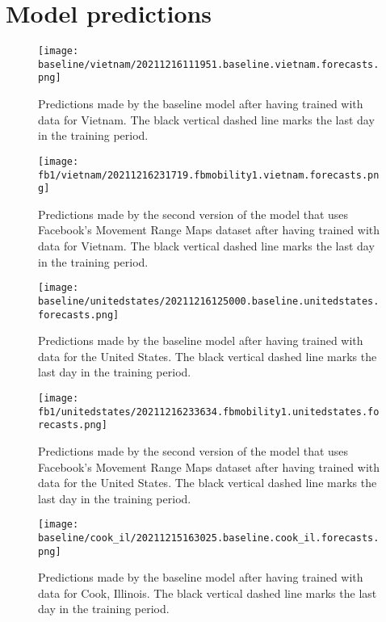 \appendix

\chapter{Model predictions}


\begin{figure}[!htb]
    \centering
    \texttt{[image: baseline/vietnam/20211216111951.baseline.vietnam.forecasts.png]}
    \caption{Predictions made by the baseline model after having trained with data for Vietnam. The black vertical dashed line marks the last day in the training period.}
    \label{fig:predictions-vietnam-baseline}
\end{figure}

\begin{figure}[!htb]
    \centering
    \texttt{[image: fb1/vietnam/20211216231719.fbmobility1.vietnam.forecasts.png]}
    \caption{Predictions made by the second version of the model that uses Facebook's Movement Range Maps dataset after having trained with data for Vietnam. The black vertical dashed line marks the last day in the training period.}
    \label{fig:predictions-vietnam-fb1}
\end{figure}


\begin{figure}[!htb]
    \centering
    \texttt{[image: baseline/unitedstates/20211216125000.baseline.unitedstates.forecasts.png]}
    \caption{Predictions made by the baseline model after having trained with data for the United States. The black vertical dashed line marks the last day in the training period.}
    \label{fig:predictions-usa-baseline}
\end{figure}

\begin{figure}[!htb]
    \centering
    \texttt{[image: fb1/unitedstates/20211216233634.fbmobility1.unitedstates.forecasts.png]}
    \caption{Predictions made by the second version of the model that uses Facebook's Movement Range Maps dataset after having trained with data for the United States. The black vertical dashed line marks the last day in the training period.}
    \label{fig:predictions-usa-fb1}
\end{figure}


\begin{figure}[!htb]
    \centering
    \texttt{[image: baseline/cook\_il/20211215163025.baseline.cook\_il.forecasts.png]}
    \caption{Predictions made by the baseline model after having trained with data for Cook, Illinois. The black vertical dashed line marks the last day in the training period.}
    \label{fig:predictions-cook-baseline}
\end{figure}

